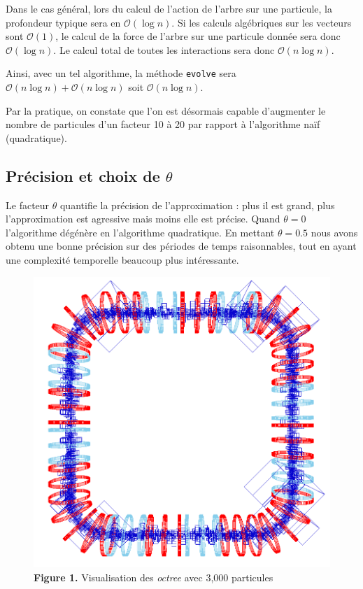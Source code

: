 \documentclass[12pt, letterpaper, twoside]{article}
\newcommand{\T}[1]{\texttt{#1}}
\def\O{\mathcal{O}}
\begin{document}
Dans le cas général, lors du calcul de l'action de l'arbre sur une particule, la profondeur typique sera en $\O(\log n)$. Si les calculs algébriques sur les vecteurs sont $\O(1)$, le calcul de la force de l'arbre sur une particule donnée sera donc $\O(\log n)$. Le calcul total de toutes les interactions sera donc $\O(n \log n)$.

Ainsi, avec un tel algorithme, la méthode \T{evolve} sera $\O(n \log n) + \O(n \log n)$ soit $\O(n \log n)$.

Par la pratique, on constate que l'on est désormais capable d'augmenter le nombre de particules d'un facteur 10 à 20 par rapport à l'algorithme naïf (quadratique).

\subsection*{Précision et choix de $\theta$}
\noindent Le facteur $\theta$ quantifie la précision de l'approximation : plus il est grand, plus l'approximation est agressive mais moins elle est précise. Quand $\theta = 0$ l'algorithme dégénère en l'algorithme quadratique. En mettant $\theta = 0.5$ nous avons obtenu une bonne précision sur des périodes de temps raisonnables, tout en ayant une complexité temporelle beaucoup plus intéressante.

\begin{figure}
	\centering
	\includegraphics[width=5in]{images/octree.png}
	\caption{\textbf{Figure 1.} Visualisation des \textit{octree} avec 3,000 particules}
\end{figure}
\end{document}
